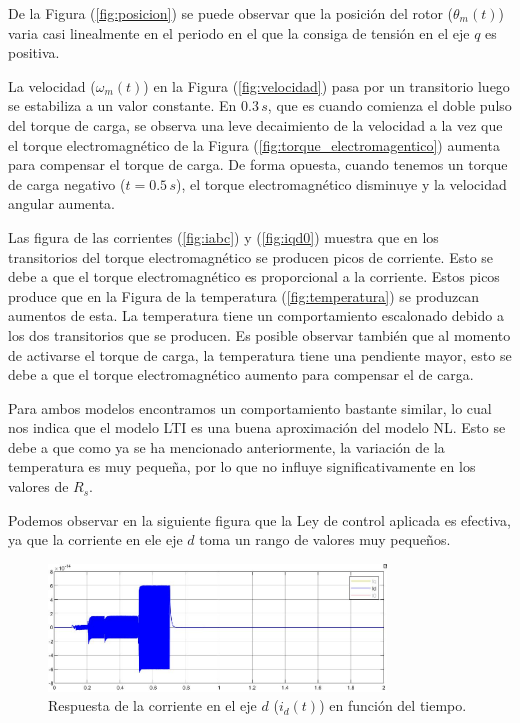 \documentclass{article}
\begin{document}
De la Figura (\ref{fig:posicion}) se puede observar que la posición del rotor ($\theta_m(t)$)
varia casi linealmente en el periodo en el que la consiga de tensión en el eje $q$ es positiva.

La velocidad ($\omega_m(t)$) en la Figura (\ref{fig:velocidad}) pasa por un transitorio luego 
se estabiliza a un valor constante. En $0.3 \, s$, que es cuando comienza el doble pulso del 
torque de carga, se observa una leve decaimiento de la velocidad a la vez que el torque electromagnético
de la Figura (\ref{fig:torque_electromagentico}) aumenta para compensar el torque de carga.
De forma opuesta, cuando tenemos un torque de carga negativo ($t = 0.5 \, s$), el torque electromagnético 
disminuye y la velocidad angular aumenta.

Las figura de las corrientes (\ref{fig:iabc}) y (\ref{fig:iqd0}) muestra que en los transitorios del torque electromagnético
se producen picos de corriente. Esto se debe a que el torque electromagnético es proporcional a la corriente.
Estos picos produce que en la Figura de la temperatura (\ref{fig:temperatura}) se produzcan aumentos de esta.
La temperatura tiene un comportamiento escalonado debido a los dos transitorios que se producen.
Es posible observar también que al momento de activarse el torque de carga, la temperatura tiene una 
pendiente mayor, esto se debe a que el torque electromagnético aumento para compensar el de carga.

Para ambos modelos encontramos un comportamiento bastante similar, lo cual nos indica que el modelo LTI
es una buena aproximación del modelo NL. Esto se debe a que como ya se ha mencionado anteriormente, la 
variación de la temperatura es muy pequeña, por lo que no influye significativamente en los valores de $R_s$.

Podemos observar en la siguiente figura que la Ley de control aplicada es efectiva, ya que la corriente
en ele eje $d$ toma un rango de valores muy pequeños.

\begin{figure}[H]
    \centering
    \includegraphics[width=0.8\textwidth]{5.1.6_id.jpg}
    \caption{Respuesta de la corriente en el eje $d$ ($i_d(t)$) en función del tiempo.}
\end{figure}
\end{document}
